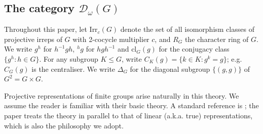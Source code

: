 \documentclass[12pt]{article}
\numberwithin{equation}{section}
\def\cD            {{\mathcal{D}}}
\begin{document}
  
 




\subsection{The category $\cD_\omega(G)$}



Throughout this paper,  let Irr$_c(G)$ denote the set
of all {isomorphism classes of projective} irreps of $G$ {with 2-cocycle 
multiplier $c$}, and $R_G$  the character ring of $G$. 
We write $g^h$ for $h^{-1}gh$, ${}^hg$ for $hgh^{-1}$ and cl$_G(g)$ for the conjugacy class
$\{g^h:h\in G\}$. For any subgroup $K\le G$, write $C_K(g)=\{k\in K:g^k=g\}$; e.g. $C_G(g)$ is the centraliser. We write $\Delta_G$ for the diagonal subgroup $\{(g,g)\}$ of $G^2=G\times G$.


Projective representations of finite groups arise naturally in this theory. We assume the reader is familiar
with their basic theory. A standard reference is \cite{Karp}; the paper  \cite{Che} treats the theory
in parallel to that of linear (a.k.a. true) representations, which is also the philosophy we adopt.
\end{document}
